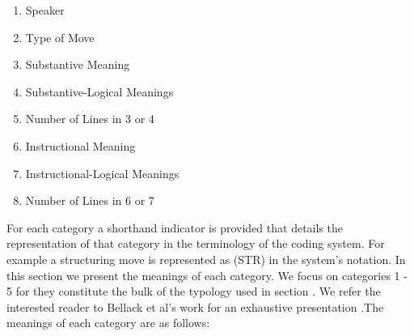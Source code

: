 \documentclass[conference]{IEEEtran}
\begin{document}
\begin{enumerate}
  \item Speaker
  \item Type of Move
  \item Substantive Meaning
  \item Substantive-Logical Meanings
  \item Number of Lines in 3 or 4
  \item Instructional Meaning
  \item Instructional-Logical Meanings
  \item Number of Lines in 6 or 7
\end{enumerate}

For each category a shorthand indicator is provided that details the
representation of that category in the terminology of the coding system.
For example a structuring move is represented as (STR) in the system's
notation. In this section we present the meanings of each category. We focus on
categories 1 - 5 for they constitute the bulk of the typology used in section
. We refer the interested reader to Bellack et al's work for an
exhaustive presentation \cite{bellack1966language}.The meanings of each category are as follows:
\end{document}
